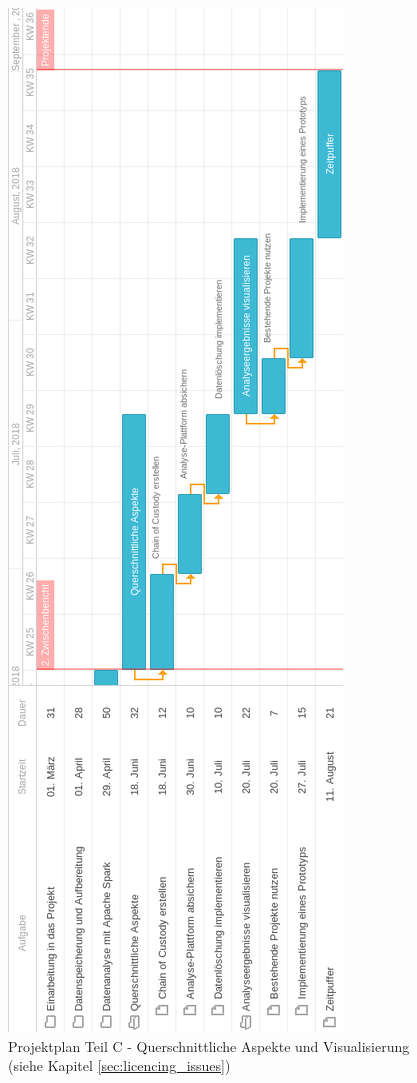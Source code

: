 \begin{figure}[p]
  \centering
  \includegraphics[width=\textwidth,height=\textheight,keepaspectratio]{./resource/ganttC.png}
  \caption{Projektplan Teil C - Querschnittliche Aspekte und Visualisierung (siehe Kapitel \ref{sec:licencing_issues})}
  \label{fig:ganttC}
\end{figure}

